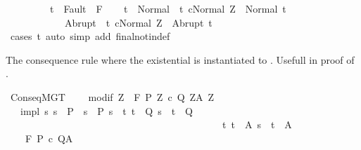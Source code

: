 \begin{isabellebody}
\ \ \ \ \ \ \ \ \ {\isachardoublequoteopen}t\ {\isasymnotin}\ Fault\ {\isacharbackquote}\ F{\isachardoublequoteclose}\isanewline
\ \ \isamarkupfalse%
\ {\isachardoublequoteopen}t\ {\isasymin}\ Normal\ {\isacharbackquote}\ {\isacharbraceleft}t{\isachardot}\ {\isasymGamma}{\isasymturnstile}{\isasymlangle}c{\isacharcomma}Normal\ Z{\isasymrangle}\ {\isasymRightarrow}\ Normal\ t{\isacharbraceright}\ {\isasymunion}\ \isanewline
\ \ \ \ \ \ \ \ \ \ \ \ Abrupt\ {\isacharbackquote}\ {\isacharbraceleft}t{\isachardot}\ {\isasymGamma}{\isasymturnstile}{\isasymlangle}c{\isacharcomma}Normal\ Z{\isasymrangle}\ {\isasymRightarrow}\ Abrupt\ t{\isacharbraceright}{\isachardoublequoteclose}\isanewline
\ \ \ \ \isamarkupfalse%
\ {\isacharparenleft}cases\ t{\isacharparenright}\ {\isacharparenleft}auto\ simp\ add{\isacharcolon}\ final{\isacharunderscore}notin{\isacharunderscore}def{\isacharparenright}\isanewline
{}\isamarkupfalse%
%
\endisatagproof
{\isafoldproof}%
%
\isadelimproof
%
\endisadelimproof
%
\begin{isamarkuptext}%
The consequence rule where the existential  is instantiated
to . Usefull in proof of .%
\end{isamarkuptext}\isamarkuptrue%
\isamarkupfalse%
\ ConseqMGT{\isacharcolon}\ \isanewline
\ \ \ modif{\isacharcolon}\ {\isachardoublequoteopen}{\isasymforall}Z{\isachardot}\ {\isasymGamma}{\isacharcomma}{\isasymTheta}\ {\isasymturnstile}\isactrlbsub {\isacharslash}F\isactrlesub \ {\isacharparenleft}P{\isacharprime}\ Z{\isacharparenright}\ c\ {\isacharparenleft}Q{\isacharprime}\ Z{\isacharparenright}{\isacharcomma}{\isacharparenleft}A{\isacharprime}\ Z{\isacharparenright}{\isachardoublequoteclose}\isanewline
\ \ \ impl{\isacharcolon}\ {\isachardoublequoteopen}{\isasymAnd}s{\isachardot}\ s\ {\isasymin}\ P\ {\isasymLongrightarrow}\ s\ {\isasymin}\ P{\isacharprime}\ s\ {\isasymand}\ {\isacharparenleft}{\isasymforall}t{\isachardot}\ t\ {\isasymin}\ Q{\isacharprime}\ s\ {\isasymlongrightarrow}\ t\ {\isasymin}\ Q{\isacharparenright}\ {\isasymand}\ \isanewline
\ \ \ \ \ \ \ \ \ \ \ \ \ \ \ \ \ \ \ \ \ \ \ \ \ \ \ \ \ \ \ \ \ \ \ \ \ \ \ \ \ \ \ \ {\isacharparenleft}{\isasymforall}t{\isachardot}\ t\ {\isasymin}\ A{\isacharprime}\ s\ {\isasymlongrightarrow}\ t\ {\isasymin}\ A{\isacharparenright}{\isachardoublequoteclose}\isanewline
\ \ \ {\isachardoublequoteopen}{\isasymGamma}{\isacharcomma}{\isasymTheta}\ {\isasymturnstile}\isactrlbsub {\isacharslash}F\isactrlesub \ P\ c\ Q{\isacharcomma}A{\isachardoublequoteclose}\isanewline

\end{isabellebody}
